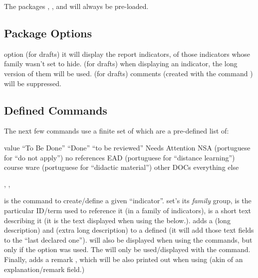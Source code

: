 \documentclass[article,nofontwarning,nogeometry,english,tocdepth=3,secdepth=3]{ufrgscca} %
\begin{document}
The packages , ,  and  will always be pre-loaded.

\subsection{Package Options}
\begin{describelist}{option}
 { (for drafts) it will display the report indicators, of those indicators whose family wasn't set to hide.}
 { (for drafts) when displaying an indicator, the long version of them will be used.}
 { (for drafts) comments (created with the command \tsmacro{\comment}) will be suppressed.}
\end{describelist}

\subsection{Defined Commands}

The next few commands use a finite set of  which are a pre-defined list of:
\begin{describelist*}{value}
     { “To Be Done”}
     { “Done”}
     { “to be reviewed”}
     { Needs Attention}
     { NSA (portuguese for “do not apply”)}
     { no references}
     { EAD (portuguese for “distance learning”)}
     { course ware (portuguese for “didactic material”) }
     { other DOCs}
     { everything else}
\end{describelist*}

\begin{codedescribe}{\declareindicator, \indicatorDesc, \indicatorText}
	\begin{codesyntax}%
		\tsobj{\declareindicator}\tsverb{*+}
	\end{codesyntax}
\tsmacro{\declareindicator}{} is the command to create/define a given “indicator”.  set's its \emph{family} group,  is the particular ID/term used to reference it (in a family of indicators),  is a short text describing it (it is the text displayed when using the \tsmacro{\indref}{} below.). \tsmacro{\indicatorDesc}{} adds a  (long description) and  (extra long description) to a defined \tsmacro{\declareindicator}{} (it will add those text fields to the “last declared one”).  will also be displayed when using the \tsmacro{\indref}{} commands, but only if the  option was used. The  will only be used/displayed with the \tsmacro{\PrintIndicators}{} command. Finally, \tsmacro{\indicatorText}{} adds a remark , which will be also printed out when using  \tsmacro{\lstind}{} (akin of an explanation/remark field.)
\end{codedescribe}
\end{document}
